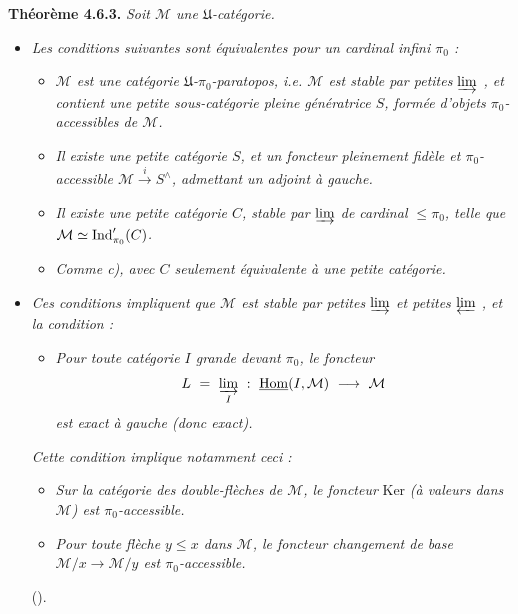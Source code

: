\textbf{Théorème 4.6.3.} \textit{Soit $\mathcal{M}$ une $\mathfrak{U}$-catégorie.}
\begin{itemize}[leftmargin=2.5em]
\item[\circled{1\textsuperscript{\textit{o}}}] \textit{Les conditions suivantes sont équivalentes pour un cardinal infini $\pi_0$ :}
\begin{itemize}[leftmargin=3em]
\item[$a_{\pi_0}$\textit{)}] \textit{$\mathcal{M}$ est une catégorie $\mathfrak{U}$-$\pi_0$-paratopos, i.e. $\mathcal{M}$ est stable par petites $\varinjlim$ , et contient une petite sous-catégorie pleine} \textit{génératrice $S$, formée d'objets $\pi_0$-accessibles de $\mathcal{M}$.}


\item[$b_{\pi_0}$\textit{)}] \textit{Il existe une petite catégorie $S$, et un foncteur pleinement fidèle et $\pi_0$-accessible $\mathcal{M}\xrightarrow{\ i\ }S^{\wedge}$, admettant un adjoint à gauche.}
\item[$c_{\pi_0}$\textit{)}] \textit{Il existe une petite catégorie $C$, stable par $\varinjlim$ de cardinal $\leqslant\pi_0$, telle que $\mathcal{M}\simeq\operatorname{Ind}'_{\pi_0}(C)$.}
\item[$c'_{\pi_0}$\textit{)}] \textit{Comme c), avec $C$ seulement équivalente à une petite catégorie.}
\end{itemize}
\item[\textit{2°)}] \textit{Ces conditions impliquent que $\mathcal{M}$ est stable par petites $\varinjlim$ et petites $\varprojlim$ , et la condition :}
\begin{itemize}[leftmargin=3em]
\item[$e_{\pi_0}$\textit{)}] \textit{Pour toute catégorie $I$ grande devant $\pi_0$, le foncteur}
\[
L \ =\ \varinjlim_{I}\ :\ \underline{\operatorname{Hom}}(I,\mathcal{M}) \ \longrightarrow\ \mathcal{M}
\]
\textit{est exact à gauche (donc exact).}
\end{itemize}
\textit{Cette condition implique notamment ceci :}
\begin{itemize}[leftmargin=3em]
\item[$\alpha(\pi_0)$] \textit{Sur la catégorie des double-flèches de $\mathcal{M}$, le foncteur} Ker \textit{(à valeurs dans $\mathcal{M}$) est $\pi_0$-accessible.}
\item[$\beta(\pi_0)$] \textit{Pour toute flèche $y\leqslant x$ dans $\mathcal{M}$, le foncteur changement de base $\mathcal{M}/x\longrightarrow\mathcal{M}/y$ est $\pi_0$-accessible.}
\end{itemize}
(\footnotemark[59]). %


\end{itemize}
